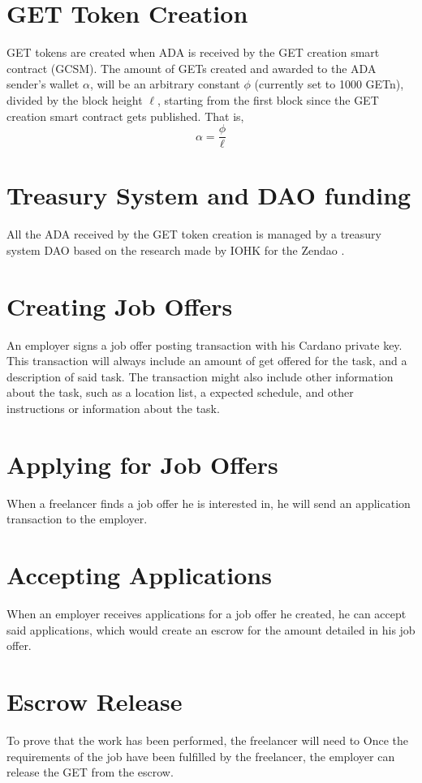 \documentclass{article}
\begin{document}
\section{GET Token Creation}
GET tokens are created when ADA is received by the GET creation smart contract (GCSM).
The amount of GETs created and awarded to the ADA sender's wallet $\alpha$, will be an arbitrary constant $\phi$ (currently set to 1000 GETn), divided by the block height $\ell$, starting from the first block since the GET creation smart contract gets published. That is,
\[ \alpha
  = \dfrac{\phi}{\ell}
\]

\section{Treasury System and DAO funding}
All the ADA received by the GET token creation is managed by a treasury system DAO based on the research made by IOHK for the Zendao \cite{zhangb2}.
 
\section{Creating Job Offers}
An employer signs a job offer posting transaction with his Cardano private key. This transaction will always include an amount of get offered for the task, and a description of said task. The transaction might also include other information about the task, such as a location list, a expected schedule, and other instructions or information about the task.

\section{Applying for Job Offers}
When a freelancer finds a job offer he is interested in, he will send an application transaction to the employer.

\section{Accepting Applications}
When an employer receives applications for a job offer he created, he can accept said applications, which would create an escrow for the amount detailed in his job offer.

\section{Escrow Release}
To prove that the work has been performed, the freelancer will need to Once the requirements of the job have been fulfilled by the freelancer, the employer can release the GET from the escrow.
\end{document}
